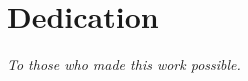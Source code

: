 \chapter*{Dedication}

\vspace*{\fill}
\begin{center}
  \textit{To those who made this work possible.}
\end{center}
\vspace*{\fill}
